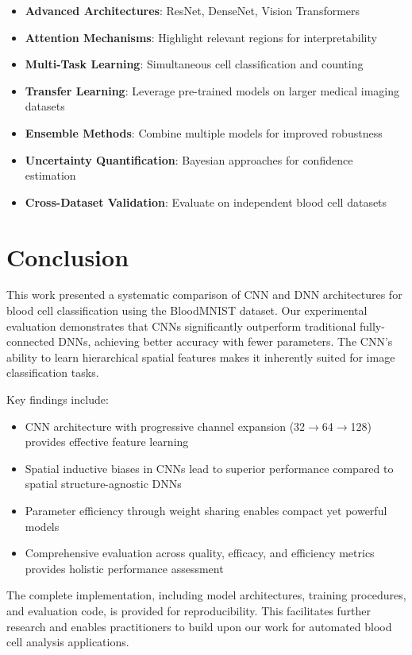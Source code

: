 \documentclass[runningheads]{llncs}
\begin{document}
\begin{itemize}
    \item \textbf{Advanced Architectures}: ResNet, DenseNet, Vision Transformers
    \item \textbf{Attention Mechanisms}: Highlight relevant regions for interpretability
    \item \textbf{Multi-Task Learning}: Simultaneous cell classification and counting
    \item \textbf{Transfer Learning}: Leverage pre-trained models on larger medical imaging datasets
    \item \textbf{Ensemble Methods}: Combine multiple models for improved robustness
    \item \textbf{Uncertainty Quantification}: Bayesian approaches for confidence estimation
    \item \textbf{Cross-Dataset Validation}: Evaluate on independent blood cell datasets
\end{itemize}

\section{Conclusion}

This work presented a systematic comparison of CNN and DNN architectures for blood cell classification using the BloodMNIST dataset. Our experimental evaluation demonstrates that CNNs significantly outperform traditional fully-connected DNNs, achieving better accuracy with fewer parameters. The CNN's ability to learn hierarchical spatial features makes it inherently suited for image classification tasks.

Key findings include:
\begin{itemize}
    \item CNN architecture with progressive channel expansion (32$\rightarrow$64$\rightarrow$128) provides effective feature learning
    \item Spatial inductive biases in CNNs lead to superior performance compared to spatial structure-agnostic DNNs
    \item Parameter efficiency through weight sharing enables compact yet powerful models
    \item Comprehensive evaluation across quality, efficacy, and efficiency metrics provides holistic performance assessment
\end{itemize}

The complete implementation, including model architectures, training procedures, and evaluation code, is provided for reproducibility. This facilitates further research and enables practitioners to build upon our work for automated blood cell analysis applications.
\end{document}
